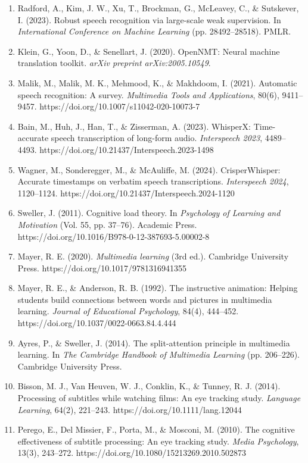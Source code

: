 \documentclass[12pt,a4paper]{article}
\begin{document}
\begin{enumerate}
    \item Radford, A., Kim, J. W., Xu, T., Brockman, G., McLeavey, C., \& Sutskever, I. (2023). Robust speech recognition via large-scale weak supervision. In \textit{International Conference on Machine Learning} (pp. 28492--28518). PMLR.
    \item Klein, G., Yoon, D., \& Senellart, J. (2020). OpenNMT: Neural machine translation toolkit. \textit{arXiv preprint arXiv:2005.10549}.
    \item Malik, M., Malik, M. K., Mehmood, K., \& Makhdoom, I. (2021). Automatic speech recognition: A survey. \textit{Multimedia Tools and Applications}, 80(6), 9411--9457. https://doi.org/10.1007/s11042-020-10073-7
    \item Bain, M., Huh, J., Han, T., \& Zisserman, A. (2023). WhisperX: Time-accurate speech transcription of long-form audio. \textit{Interspeech 2023}, 4489--4493. https://doi.org/10.21437/Interspeech.2023-1498
    \item Wagner, M., Sonderegger, M., \& McAuliffe, M. (2024). CrisperWhisper: Accurate timestamps on verbatim speech transcriptions. \textit{Interspeech 2024}, 1120--1124. https://doi.org/10.21437/Interspeech.2024-1120
    \item Sweller, J. (2011). Cognitive load theory. In \textit{Psychology of Learning and Motivation} (Vol. 55, pp. 37--76). Academic Press. https://doi.org/10.1016/B978-0-12-387693-5.00002-8
    \item Mayer, R. E. (2020). \textit{Multimedia learning} (3rd ed.). Cambridge University Press. https://doi.org/10.1017/9781316941355
    \item Mayer, R. E., \& Anderson, R. B. (1992). The instructive animation: Helping students build connections between words and pictures in multimedia learning. \textit{Journal of Educational Psychology}, 84(4), 444--452. https://doi.org/10.1037/0022-0663.84.4.444
    \item Ayres, P., \& Sweller, J. (2014). The split-attention principle in multimedia learning. In \textit{The Cambridge Handbook of Multimedia Learning} (pp. 206--226). Cambridge University Press.
    \item Bisson, M. J., Van Heuven, W. J., Conklin, K., \& Tunney, R. J. (2014). Processing of subtitles while watching films: An eye tracking study. \textit{Language Learning}, 64(2), 221--243. https://doi.org/10.1111/lang.12044
    \item Perego, E., Del Missier, F., Porta, M., \& Mosconi, M. (2010). The cognitive effectiveness of subtitle processing: An eye tracking study. \textit{Media Psychology}, 13(3), 243--272. https://doi.org/10.1080/15213269.2010.502873

\end{enumerate}
\end{document}
